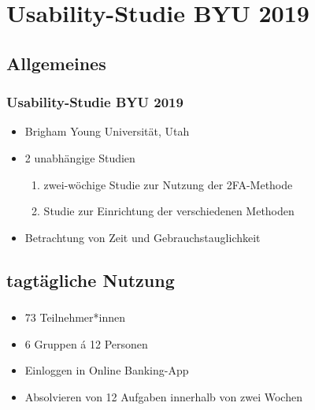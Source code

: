 \section{Usability-Studie BYU 2019}

\subsection*{Allgemeines}
\begin{frame}
    \frametitle{Usability-Studie BYU 2019}

    \begin{itemize}
        \item Brigham Young Universität, Utah
        \item 2 unabhängige Studien
              \begin{enumerate}
                  \item zwei-wöchige Studie zur Nutzung der 2FA-Methode
                  \item Studie zur Einrichtung der verschiedenen Methoden
              \end{enumerate}
        \item Betrachtung von Zeit und Gebrauchstauglichkeit
    \end{itemize}

    \note{
        \begin{itemize}
        \end{itemize}
    }

\end{frame}

\subsection{tagtägliche Nutzung}
\begin{frame}
    \frametitle{\currentsectionname}

    \begin{itemize}
        \item 73 Teilnehmer*innen
        \item 6 Gruppen \'{a} 12 Personen
        \item Einloggen in Online Banking-App
        \item Absolvieren von 12 Aufgaben innerhalb von zwei Wochen
    \end{itemize}


\end{frame}

